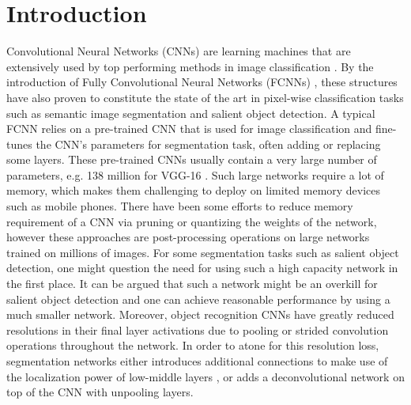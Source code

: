 \documentclass[a4paper,conference]{IEEEtran}
\begin{document}




%
\IEEEpeerreviewmaketitle



\section{Introduction}
{C}{onvolutional} Neural Networks (CNNs) are learning machines that are extensively used by top performing methods in image classification \cite{Krizhevsky,Simonyan,Szegedy,He}.
By the introduction of Fully Convolutional Neural Networks (FCNNs) \cite{Long}, these structures have also proven to constitute the state of the art in pixel-wise classification tasks such as semantic image segmentation and salient object detection.
A typical FCNN relies on a pre-trained CNN that is used for image classification and fine-tunes the CNN's parameters for segmentation task, often adding or replacing some layers.
These pre-trained CNNs usually contain a very large number of parameters, e.g. 138 million for VGG-16 \cite{Simonyan}.
Such large networks require a lot of memory, which makes them challenging to deploy on limited memory devices such as mobile phones.
There have been some efforts to reduce memory requirement of a CNN via pruning \cite{Hanc} or quantizing \cite{Guptac} the weights of the network, however these approaches are post-processing operations on large networks trained on millions of images.
For some segmentation tasks such as salient object detection, one might question the need for using such a high capacity network in the first place.
It can be argued that such a network might be an overkill for salient object detection and one can achieve reasonable performance by using a much smaller network.
Moreover, object recognition CNNs have greatly reduced resolutions in their final layer activations due to pooling or strided convolution operations throughout the network.
In order to atone for this resolution loss, segmentation networks either introduces additional connections to make use of the localization power of low-middle layers \cite{Long,Hariharan}, or adds a deconvolutional network on top of the CNN \cite{Badrinarayanan, Noh} with unpooling layers.
\end{document}
